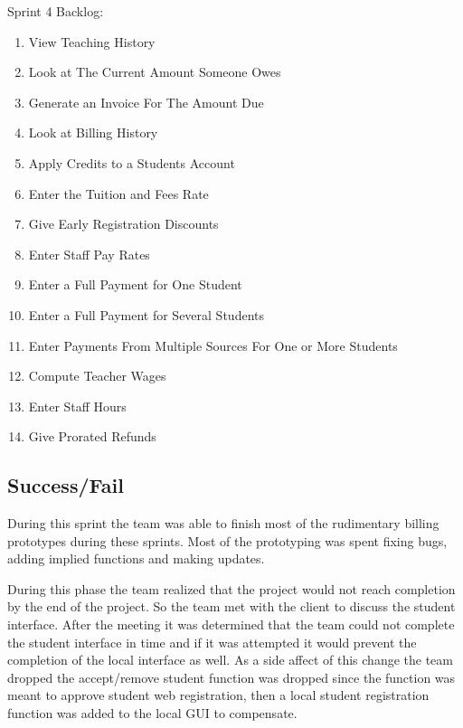 Sprint 4 Backlog:

\begin{enumerate}
\item View Teaching History
\item Look at The Current Amount Someone Owes
\item Generate an Invoice For The Amount Due
\item Look at Billing History
\item Apply Credits to a Students Account
\item Enter the Tuition and Fees Rate
\item Give Early Registration Discounts
\item Enter Staff Pay Rates
\item Enter a Full Payment for One Student 
\item Enter a Full Payment for Several Students
\item Enter Payments From Multiple Sources For One or More Students
\item Compute Teacher Wages 
\item Enter Staff Hours
\item Give Prorated Refunds 
\end{enumerate}


\subsection{Success/Fail}

During this sprint the team was able to finish most of the rudimentary billing prototypes during these sprints. Most of the prototyping was spent fixing bugs, adding implied functions and making updates.

During this phase the team realized that the project would not reach completion by the end of the project. So the team met with the client to discuss the student interface. After the meeting it was determined that the team could not complete the student interface in time and if it was attempted it would prevent the completion of the local interface as well. As a side affect of this change the team dropped the accept/remove student function was dropped since the function was meant to approve student web registration, then a local student registration function was added to the local GUI to compensate.\\


